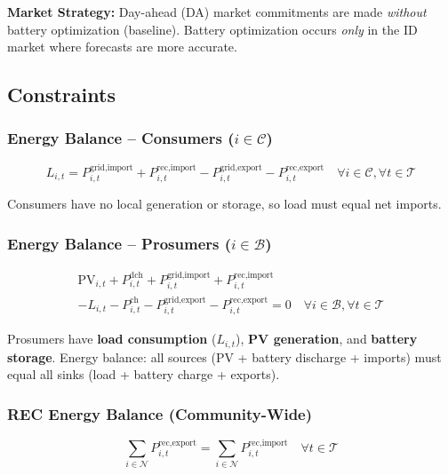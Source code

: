 \documentclass[11pt,a4paper]{article}
\begin{document}
\textbf{Market Strategy:} Day-ahead (DA) market commitments are made \textit{without} battery optimization (baseline). Battery optimization occurs \textit{only} in the ID market where forecasts are more accurate.

\subsection{Constraints}

\subsubsection{Energy Balance -- Consumers ($i \in \mathcal{C}$)}

\begin{equation}
L_{i,t} = P_{i,t}^{\text{grid,import}} + P_{i,t}^{\text{rec,import}} - P_{i,t}^{\text{grid,export}} - P_{i,t}^{\text{rec,export}} \quad \forall i \in \mathcal{C}, \forall t \in \mathcal{T}
\end{equation}

Consumers have no local generation or storage, so load must equal net imports.

\subsubsection{Energy Balance -- Prosumers ($i \in \mathcal{B}$)}

\begin{equation}
\begin{split}
\text{PV}_{i,t} + P_{i,t}^{\text{dch}} + P_{i,t}^{\text{grid,import}} + P_{i,t}^{\text{rec,import}} \\
- L_{i,t} - P_{i,t}^{\text{ch}} - P_{i,t}^{\text{grid,export}} - P_{i,t}^{\text{rec,export}} = 0 \quad \forall i \in \mathcal{B}, \forall t \in \mathcal{T}
\end{split}
\end{equation}

Prosumers have \textbf{load consumption} ($L_{i,t}$), \textbf{PV generation}, and \textbf{battery storage}. Energy balance: all sources (PV + battery discharge + imports) must equal all sinks (load + battery charge + exports).

\subsubsection{REC Energy Balance (Community-Wide)}

\begin{equation}
\sum_{i \in \mathcal{N}} P_{i,t}^{\text{rec,export}} = \sum_{i \in \mathcal{N}} P_{i,t}^{\text{rec,import}} \quad \forall t \in \mathcal{T}
\end{equation}
\end{document}
